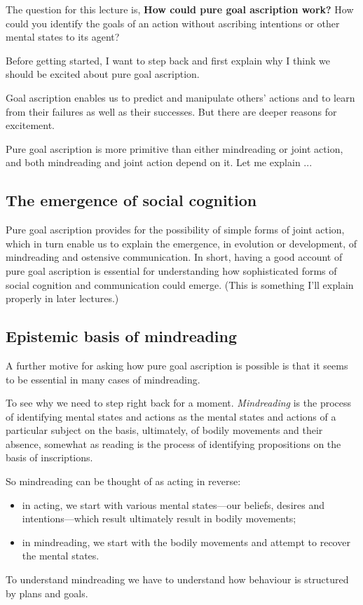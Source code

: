 \documentclass[12pt,\papersize]{extarticle}
\begin{document}
The question for this lecture is,
\newcommand{\theQuestion}{How could pure goal ascription work? }
\textbf{\theQuestion} 
How could you identify the goals of an action without ascribing intentions or other mental states to its agent?

Before getting started, I want to step back and first explain why I think we should be excited about pure goal ascription.

Goal ascription enables us to
	predict and manipulate others' actions
	and to learn from their 
		failures 
	as well as their 
		successes.
But there are deeper reasons for excitement.

Pure goal ascription is more primitive than either mindreading or joint action, and both mindreading and joint action depend on it.
Let me explain ...


\subsection{The emergence of social cognition}
Pure goal ascription provides for the possibility of simple forms of joint action,
	which in turn enable us to explain the emergence, in evolution or development, of mindreading and ostensive communication.
In short, having a good account of pure goal ascription is essential for understanding how sophisticated forms of social cognition and communication could emerge.
(This is something I'll explain properly in later lectures.)

\subsection{Epistemic basis of mindreading}
A further motive for asking how pure goal ascription is possible is that it seems to be essential in many cases of mindreading.

To see why we need to step right back for a moment.
\textit{Mindreading} is 
	the process of 
	identifying mental states and actions 
	as the mental states and actions 	of a particular subject 
	on the basis, ultimately, of bodily movements and their absence,
somewhat as reading is the process of identifying propositions on the basis of inscriptions.\citep%
{Apperly:2010kx}

So mindreading can be thought of as acting in reverse:
%
\begin{itemize}
\item in acting, we start with various mental states---our beliefs, desires and intentions---which result ultimately result in bodily movements;
\item in mindreading, we start with the bodily movements and attempt to recover the mental states.
\end{itemize}
%
To understand mindreading  we have to understand how behaviour is structured by plans and goals.  
\end{document}
